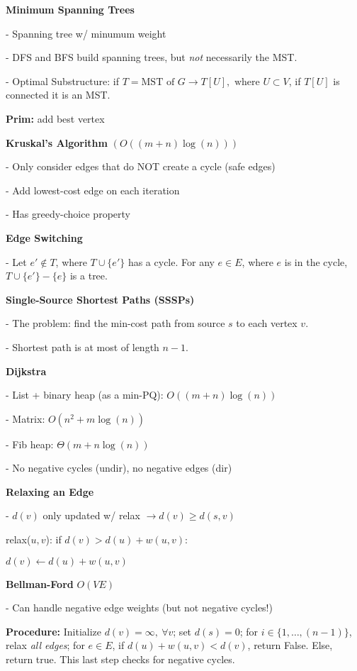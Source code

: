 \documentclass[letterpaper]{article}
\begin{document}
\begin{minipage}[t]{0.45\textwidth}

    
\textbf{Minimum Spanning Trees}

- Spanning tree w/ minumum weight

- DFS and BFS build spanning trees, but \emph{not} necessarily the MST.

- Optimal Substructure: if $T = \text{MST of } G \rightarrow T[U], \text{ where } U \subset V$, if $T[U]$ is connected it is an MST.


\textbf{Prim: } add best vertex


\textbf{Kruskal's Algorithm} $(O((m + n)\log(n)))$

- Only consider edges that do NOT create a cycle (safe edges)

- Add lowest-cost edge on each iteration

- Has greedy-choice property


\textbf{Edge Switching}

- Let $e' \notin T$, where $T \cup \{e'\}$ has a cycle. For any $e \in E$, where $e$ is in the cycle, $T \cup \{e'\} - \{e\}$ is a tree.


\textbf{Single-Source Shortest Paths (SSSPs)}

- The problem: find the min-cost path from source $s$ to each vertex $v$.

- Shortest path is at most of length $n-1$.


\textbf{Dijkstra}

- List + binary heap (as a min-PQ): $O((m+n)\log(n))$

- Matrix: $O(n^2 + m\log(n))$

- Fib heap: $\Theta(m + n\log(n))$

- No negative cycles (undir), no negative edges (dir)


\textbf{Relaxing an Edge}

- $d(v)$ only updated w/ relax $\rightarrow d(v) \geq d(s, v)$

relax($u, v$): if $d(v) > d(u) + w(u, v)$:

\hspace{0.5cm} $d(v) \leftarrow d(u) + w(u, v)$


\textbf{Bellman-Ford} $O(VE)$

- Can handle negative edge weights (but not negative cycles!)


{\small \textbf{Procedure:}
Initialize $d(v) = \infty,\ \forall v$; set $d(s) = 0$; for $i \in \{1, \ldots, (n-1)\}$, relax \emph{all edges}; for $e \in E$, if $d(u) + w(u, v) < d(v)$, return False. Else, return true. This last step checks for negative cycles.}


\end{minipage}
\end{document}
